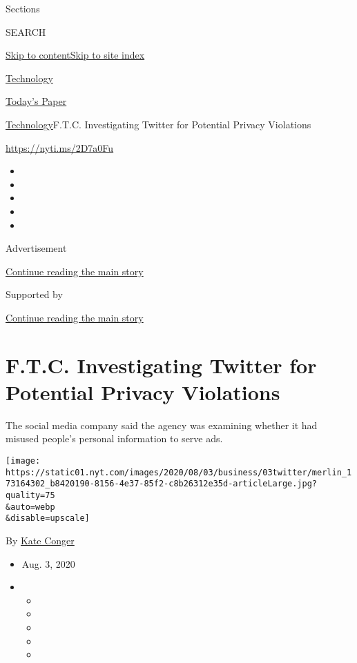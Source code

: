 Sections

SEARCH

\protect\hyperlink{site-content}{Skip to
content}\protect\hyperlink{site-index}{Skip to site index}

\href{https://www.nytimes.com/section/technology}{Technology}

\href{https://myaccount.nytimes.com/auth/login?response_type=cookie\&client_id=vi}{}

\href{https://www.nytimes.com/section/todayspaper}{Today's Paper}

\href{/section/technology}{Technology}\textbar{}F.T.C. Investigating
Twitter for Potential Privacy Violations

\url{https://nyti.ms/2D7a0Fu}

\begin{itemize}
\item
\item
\item
\item
\item
\end{itemize}

Advertisement

\protect\hyperlink{after-top}{Continue reading the main story}

Supported by

\protect\hyperlink{after-sponsor}{Continue reading the main story}

\hypertarget{ftc-investigating-twitter-for-potential-privacy-violations}{%
\section{F.T.C. Investigating Twitter for Potential Privacy
Violations}\label{ftc-investigating-twitter-for-potential-privacy-violations}}

The social media company said the agency was examining whether it had
misused people's personal information to serve ads.

\texttt{[image: https://static01.nyt.com/images/2020/08/03/business/03twitter/merlin\_173164302\_b8420190-8156-4e37-85f2-c8b26312e35d-articleLarge.jpg?quality=75\\\&auto=webp\\\&disable=upscale]}

By \href{https://www.nytimes.com/by/kate-conger}{Kate Conger}

\begin{itemize}
\item
  Aug. 3, 2020
\item
  \begin{itemize}
  \item
  \item
  \item
  \item
  \item
  \end{itemize}
\end{itemize}


